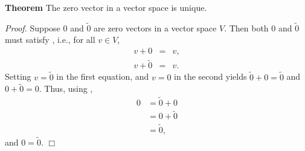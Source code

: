 \documentclass[12pt]{article}
\begin{document}

{\bf Theorem} The zero vector in a vector space is unique.

\emph{Proof.} Suppose $0$ and $\tilde{0}$ are zero vectors
in a vector space $V$. Then both
$0$ and $\tilde{0}$ must satisfy
,
i.e., for all $v\in V$,
\begin{eqnarray*}
v + 0 &=& v,\\
v + \tilde{0} &=& v.
\end{eqnarray*}
Setting $v=\tilde{0}$ in the first equation, and $v=0$
in the second yields
$\tilde{0} + 0 = \tilde{0}$ and
$0 + \tilde{0} = 0$. Thus, using
,
\begin{eqnarray*}
{\displaystyle0} &= \tilde{0} + 0 \\
  &= 0 + \tilde{0} \\
  &= \tilde{0},
\end{eqnarray*}
and $0=\tilde{0}$. $\Box$
\end{document}

